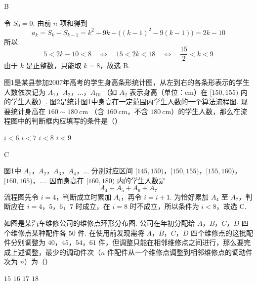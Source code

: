 \begin{answer}
B
\end{answer}

\begin{solution}
令 \(S_0=0\). 由前 \(n\) 项和得到
\[
a_k=S_k-S_{k-1}=k^2-9k-\bigl((k-1)^2-9(k-1)\bigr)=2k-10
\]
所以
\[
5<2k-10<8\quad\Longleftrightarrow\quad 15<2k<18\quad\Longleftrightarrow\quad \frac{15}{2}<k<9
\]
由于 \(k\) 是正整数，只能取 \(k=8\)，故选 B.
\end{solution}

\begin{problem}
图1是某县参加2007年高考的学生身高条形统计图，从左到右的各条形表示的学生人数依次记为 \(A_{1}\)，\(A_{2}\)，\(\dots\)，\(A_{10}\) （如 \(A_{2}\) 表示身高（单位：\(\mathrm{cm}\)）在 \([150, 155)\) 内的学生人数）. 图2是统计图1中身高在一定范围内学生人数的一个算法流程图. 现要统计身高在 \(160 \sim 180 \mathrm{~cm}\) （含 \(160 \mathrm{~cm}\)，不含 \(180 \mathrm{~cm}\)）的学生人数，那么在流程图中的判断框内应填写的条件是（\quad）


\choices
    {\(i < 6\)}
    {\(i < 7\)}
    {\(i < 8\)}
    {\(i < 9\)}
\end{problem}

\begin{answer}
C
\end{answer}

\begin{solution}
图1中 \(A_1\)，\(A_2\)，\(A_3\)，\(A_4\)，\(\ldots\) 分别对应区间 \([145,150)\)，\([150,155)\)，\([155,160)\)，\([160,165)\)，\(\ldots\). 因而身高在 \([160,180)\) 内的学生人数是
\[
A_4+A_5+A_6+A_7
\]
流程图先令 \(i=4\)，判断成立时累加 \(A_i\)，再令 \(i=i+1\). 为恰好累加 \(A_4\) 至 \(A_7\)，判断应在 \(i=4\)，\(5\)，\(6\)，\(7\) 时成立，在 \(i=8\) 时不成立，所以条件为 \(i<8\)，故选 C.
\end{solution}

\begin{problem}
如图是某汽车维修公司的维修点环形分布图. 公司在年初分配给 \(A\)，\(B\)，\(C\)，\(D\) 四个维修点某种配件各 \(50\) 件. 在使用前发现需将 \(A\)，\(B\)，\(C\)，\(D\) 四个维修点的这批配件分别调整为 \(40\)，\(45\)，\(54\)，\(61\) 件，但调整只能在相邻维修点之间进行，那么要完成上述调整，最少的调动件次（\(n\) 件配件从一个维修点调整到相邻维修点的调动件次为 \(n\)）为（\quad）


\choices
    {\(15\)}
    {\(16\)}
    {\(17\)}
    {\(18\)}
\end{problem}

